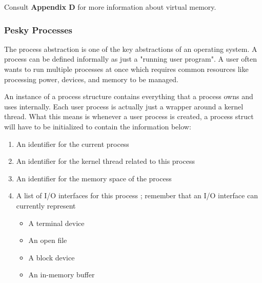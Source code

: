 \documentclass{article}
\begin{document}
	

	Consult \textbf{Appendix D} for more information about virtual memory.

	\subsubsection{Pesky Processes}
	
	The process abstraction is one of the key abstractions of an operating system. A process can be
	defined informally as just a "running user program". A user often wants to run multiple processes
	at once which requires common resources like processing power, devices, and memory to be managed.
	
	An instance of a process structure contains everything that a process
	owns and uses internally. Each user process is actually just a wrapper
	around a kernel thread. What this means is whenever a user process is
	created, a process struct will have to be initialized to contain the
	information below:
	
	\begin{enumerate}
	    \item An identifier for the current process
	    \item An identifier for the kernel thread related to this process
	    \item An identifier for the memory space of the process
	    \item A list of I/O interfaces for this process ; 
	   remember that an I/O interface can currently represent
	        \begin{itemize}
	            \item A terminal device
	            \item An open file
	            \item A block device
	            \item An in-memory buffer
	        \end{itemize}
	\end{enumerate}
	
\end{document}
